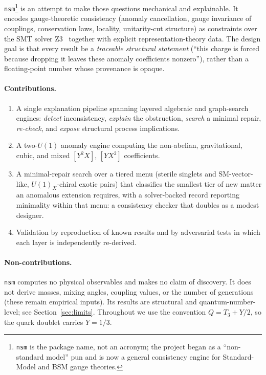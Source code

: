 \documentclass[11pt]{article}
\newcommand{\nsm}{\texttt{nsm}}
\newcommand{\UX}{U(1)_X}
\begin{document}
\nsm{}\footnote{\nsm{} is the package name, not an acronym; the project began
as a ``non-standard model'' pun and is now a general consistency engine for
Standard-Model and BSM gauge theories.} is an attempt to make those questions
mechanical and explainable. It
encodes gauge-theoretic consistency (anomaly cancellation, gauge invariance of
couplings, conservation laws, locality, unitarity-cut structure) as constraints
over the SMT solver Z3~\cite{z3} together with explicit representation-theory
data. The design goal is that every result be a \emph{traceable structural
statement} (``this charge is forced because dropping it leaves these anomaly
coefficients nonzero''), rather than a floating-point number whose provenance is
opaque.

\paragraph{Contributions.}
\begin{enumerate}
\item A single explanation pipeline spanning layered algebraic and graph-search engines:
\emph{detect} inconsistency, \emph{explain} the obstruction, \emph{search} a
minimal repair, \emph{re-check}, and \emph{expose} structural process
implications.
\item A two-$U(1)$ anomaly engine computing the non-abelian, gravitational,
cubic, and mixed $[Y^2X]$, $[YX^2]$ coefficients.
\item A minimal-repair search over a tiered menu (sterile singlets and
SM-vector-like, $\UX$-chiral exotic pairs) that classifies the smallest tier of
new matter an anomalous extension requires, with a solver-backed record
reporting minimality within that menu: a consistency checker that doubles as a
modest designer.
\item Validation by reproduction of known results and by adversarial tests in
which each layer is independently re-derived.
\end{enumerate}

\paragraph{Non-contributions.}
\nsm{} computes no physical observables and makes no claim of discovery. It does
not derive masses, mixing angles, coupling values, or the number of generations
(these remain empirical inputs). Its results are structural and
quantum-number-level; see Section~\ref{sec:limits}. Throughout we use the
convention $Q = T_3 + Y/2$, so the quark doublet carries $Y = 1/3$.
\end{document}
